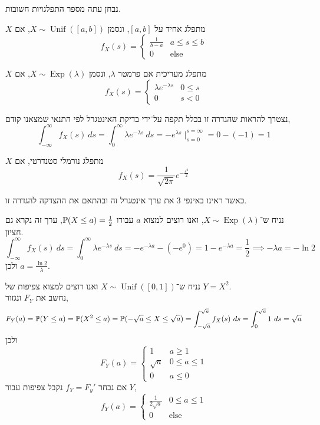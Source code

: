 נבחן עתה מספר התפלגויות חשובות.
\begin{definition}
	$X$ מתפלג אחיד על $[a, b]$, ונסמן $X \sim \operatorname{Unif}([a, b])$, אם
	\[
		f_X(s) = \begin{cases}
			\frac{1}{b - a} & a \le s \le b \\
			0 & \text{else}
		\end{cases}
	\]
\end{definition}
\begin{definition}
	$X$ מתפלג מעריכית אם פרמטר $\lambda$, ונסמן $X \sim \operatorname{Exp}(\lambda)$, אם
	\[
		f_X(s) = \begin{cases}
			\lambda e^{-\lambda s} & 0 \le s \\
			0 & s < 0
		\end{cases}
	\]
\end{definition}
נצטרך להראות שהגדרה זו בכלל תקפה על־ידי בדיקת האינטגרל לפי התנאי שמצאנו קודם,
\[
	\int_{-\infty}^\infty f_X(s)\ ds
	= \int_0^\infty \lambda e^{-\lambda s}\ ds
	= -e^{\lambda s} \mid_{s = 0}^{s = \infty}
	= 0 - (-1)
	= 1
\]
\begin{definition}\label{standard_normal_distribution}
	$X$ מתפלג נורמלי סטנדרטי, אם
	\[
		f_X(s) = \frac{1}{\sqrt{2 \pi}} e^{-\frac{s^2}{2}}
	\]
\end{definition}
כאשר ראינו באינפי 3 את ערך אינטגרל זה ובהתאם את ההצדקה להגדרה זו.
\begin{example}
	נניח ש־$X \sim \operatorname{Exp}(\lambda)$, ואנו רוצים למצוא $a$ עבורו $\mathbb{P}(X \le a) = \frac{1}{2}$, ערך זה נקרא גם חציון.
	\[
		\int_{-\infty}^{\infty} f_X(s)\ ds
		= \int_{0}^{\infty} \lambda e^{-\lambda s}\ ds
		= -e^{-\lambda a} - (-e^0)
		= 1 - e^{-\lambda a}
		= \frac{1}{2}
		\implies -\lambda a = - \ln 2
	\]
	ולכן $a = \frac{\ln 2}{\lambda}$.
\end{example}
\begin{example}
	נניח ש־$X \sim \operatorname{Unif}([0, 1])$ ואנו רוצים למצוא צפיפות של $Y = X^2$. \\
	נחשב את $F_Y$ ונגזור,
	\[
		F_Y(a)
		= \mathbb{P}(Y \le a)
		= \mathbb{P}(X^2 \le a)
		= \mathbb{P}(-\sqrt{a} \le X \le \sqrt{a})
		= \int_{-\sqrt{a}}^{\sqrt{a}} f_X(s)\ ds
		= \int_0^{\sqrt{a}} 1\ ds
		= \sqrt{a}
	\]
	ולכן
	\[
		F_Y(a) = \begin{cases}
			1 & a \ge 1 \\
			\sqrt{a} & 0 \le a \le 1 \\
			0 & a \le 0
		\end{cases}
	\]
	אם נבחר $f_Y = F_y'$ נקבל צפיפות עבור $Y$,
	\[
		f_Y(a)
		= \begin{cases}
			\frac{1}{2 \sqrt{a}} & 0 \le a \le 1 \\
			0 & \text{else}
		\end{cases}
	\]
\end{example}

